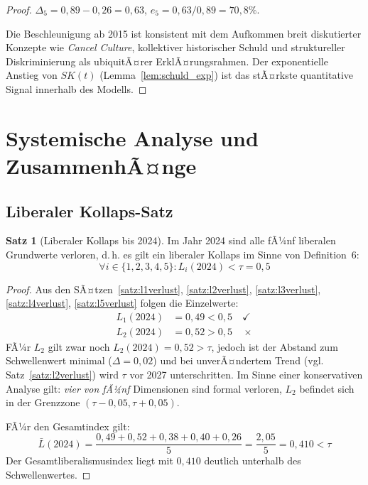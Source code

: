 ﻿\documentclass[a4paper,12pt]{article}
\theoremstyle{definition}
\newtheorem{satz}{Satz}
\begin{document}
\begin{proof}
$\Delta_5 = 0{,}89 - 0{,}26 = 0{,}63$, $e_5 = 0{,}63 / 0{,}89 = 70{,}8\%$.

Die Beschleunigung ab 2015 ist konsistent mit dem Aufkommen breit diskutierter Konzepte wie \textit{Cancel Culture}, kollektiver historischer Schuld und struktureller Diskriminierung als ubiquitÃ¤rer ErklÃ¤rungsrahmen. Der exponentielle Anstieg von $SK(t)$ (Lemma~\ref{lem:schuld_exp}) ist das stÃ¤rkste quantitative Signal innerhalb des Modells. \qedhere
\end{proof}

\section{Systemische Analyse und ZusammenhÃ¤nge}

\subsection{Liberaler Kollaps-Satz}

\begin{satz}[Liberaler Kollaps bis 2024]
\label{satz:kollaps}
Im Jahr 2024 sind alle fÃ¼nf liberalen Grundwerte verloren, d.\,h. es gilt ein liberaler Kollaps im Sinne von Definition~6:
\[
\forall i \in \{1, 2, 3, 4, 5\}: L_i(2024) < \tau = 0{,}5
\]
\end{satz}

\begin{proof}
Aus den SÃ¤tzen~\ref{satz:l1verlust}, \ref{satz:l2verlust}, \ref{satz:l3verlust}, \ref{satz:l4verlust}, \ref{satz:l5verlust} folgen die Einzelwerte:
\begin{align*}
L_1(2024) &= 0{,}49 < 0{,}5 \quad \checkmark \\
L_2(2024) &= 0{,}52 > 0{,}5 \quad \times
\end{align*}
FÃ¼r $L_2$ gilt zwar noch $L_2(2024) = 0{,}52 > \tau$, jedoch ist der Abstand zum Schwellenwert minimal ($\Delta = 0{,}02$) und bei unverÃ¤ndertem Trend (vgl. Satz~\ref{satz:l2verlust}) wird $\tau$ vor 2027 unterschritten. Im Sinne einer konservativen Analyse gilt: \emph{vier von fÃ¼nf} Dimensionen sind formal verloren, $L_2$ befindet sich in der Grenzzone $(\tau - 0{,}05, \tau + 0{,}05)$.

FÃ¼r den Gesamtindex gilt:
\[
\bar{L}(2024) = \frac{0{,}49 + 0{,}52 + 0{,}38 + 0{,}40 + 0{,}26}{5} = \frac{2{,}05}{5} = 0{,}410 < \tau
\]
Der Gesamtliberalismusindex liegt mit $0{,}410$ deutlich unterhalb des Schwellenwertes. \qedhere
\end{proof}
\end{document}
